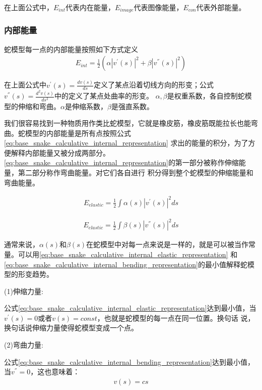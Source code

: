 在上面公式中，$E_{int}$代表内在能量，$E_{image}$代表图像能量，$E_{con}$代表外部能量。

\subsubsection{内部能量}
蛇模型每一点的内部能量按照如下方式定义
\begin{align}\label{eq:base_snake_calculative_internal_representation}
	E_{int} = \frac{1}{2}(\alpha|v^{'}(s)|^{2}+\beta|v^{''}(s)|^{2})
\end{align}

在上面公式中$v^{'}(s)=\frac{dv(s)}{ds}$定义了某点沿着切线方向的形变；公式$v^{''}(s)=\frac{d^{2}v(s)}{ds^{2}}$中的定义了某点处曲率的形变。
$\alpha,\beta$是权重系数，各自控制蛇模型的伸缩和弯曲。$\alpha$是伸缩系数，$\beta$是强直系数。


我们很容易找到一种物质用作类比蛇模型，它就是橡皮筋，橡皮筋既能拉长也能弯曲。蛇模型的内部能量是所有点按照公式\eqref{eq:base_snake_calculative_internal_representation}
求出的能量的积分，为了方便解释内部能量又被分成两部分。\eqref{eq:base_snake_calculative_internal_representation}的第一部分被称作伸缩能量，第二部分称作弯曲能量。对它们各自进行
积分得到整个蛇模型的伸缩能量和弯曲能量。

\begin{align}\label{eq:base_snake_calculative_internal_elastic_representation}
	E_{elastic} = \frac{1}{2}\int\alpha(s)|v^{'}(s)|^{2}ds
\end{align}

\begin{align}\label{eq:base_snake_calculative_internal_bending_representation}
	E_{elastic} = \frac{1}{2}\int\beta(s)|v^{''}(s)|^{2}ds
\end{align}

通常来说，$\alpha(s)$和$\beta(s)$在蛇模型中对每一点来说是一样的，就是可以被当作常量。可以用\eqref{eq:base_snake_calculative_internal_elastic_representation}
和\eqref{eq:base_snake_calculative_internal_bending_representation}的最小值解释蛇模型的形变趋势。

(1)伸缩力量:

公式\eqref{eq:base_snake_calculative_internal_elastic_representation}达到最小值，当$v^{'}(s)=0$或者$v(s)=const$，也就是蛇模型的每一点在同一位置。换句话
说，换句话说伸缩力量使得蛇模型变成一个点。

(2)弯曲力量:

公式\eqref{eq:base_snake_calculative_internal_bending_representation}达到最小值，当$v^{''}=0$，这也意味着：
\begin{align}\label{eq:simple_vs_function}
	v(s) = cs
\end{align}

